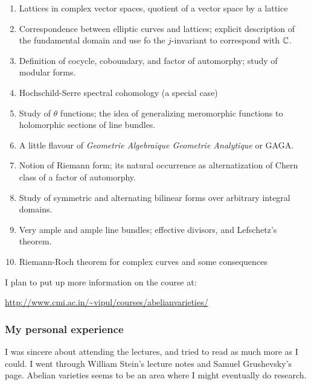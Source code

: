 \documentclass[a4paper]{amsart}
\begin{document}
\begin{enumerate}

\item Lattices in complex vector spaces, quotient of a vector space by
  a lattice

\item Correspondence between elliptic curves and lattices; explicit
  description of the fundamental domain and use fo the $j$-invariant
  to correspond with $\mathbb{C}$.

\item Definition of cocycle, coboundary, and factor of automorphy; study
  of modular forms.

\item Hochschild-Serre spectral cohomology (a special case)

\item Study of $\theta$ functions; the idea of generalizing meromorphic
  functions to holomorphic sections of line bundles.

\item A little flavour of {\em Geometrie Algebraique Geometrie Analytique} or
  GAGA.

\item Notion of Riemann form; its natural occurrence as alternatization
  of Chern class of a factor of automorphy.

\item Study of symmetric and alternating bilinear forms over arbitrary
  integral domains.

\item Very ample and ample line bundles; effective divisors, and
  Lefschetz's theorem.

\item Riemann-Roch theorem for complex curves and some consequences
\end{enumerate}

I plan to put up more information on the course at:

\url{http://www.cmi.ac.in/~vipul/courses/abelianvarieties/}

\subsubsection{My personal experience}

I was sincere about attending the lectures, and tried to read as much
more as I could. I went through William Stein's lecture notes and
Samuel Grushevsky's page. Abelian varieties seems to be an area where
I might eventually do research.
\end{document}
